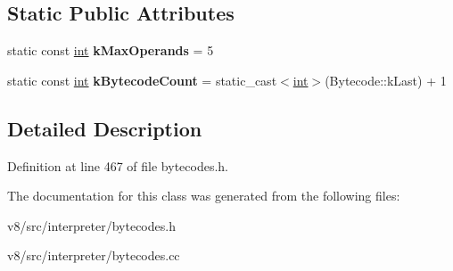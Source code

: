 \subsection*{Static Public Attributes}
\begin{DoxyCompactItemize}
\item 
\mbox{\label{classv8_1_1internal_1_1interpreter_1_1Bytecodes_a59a25d6f1d42143d77de614ce2415491}} 
static const \mbox{\hyperlink{classint}{int}} {\bfseries k\+Max\+Operands} = 5
\item 
\mbox{\label{classv8_1_1internal_1_1interpreter_1_1Bytecodes_a2f936ba0527c716efea335cbeddc2594}} 
static const \mbox{\hyperlink{classint}{int}} {\bfseries k\+Bytecode\+Count} = static\+\_\+cast$<$\mbox{\hyperlink{classint}{int}}$>$(Bytecode\+::k\+Last) + 1
\end{DoxyCompactItemize}


\subsection{Detailed Description}


Definition at line 467 of file bytecodes.\+h.



The documentation for this class was generated from the following files\+:\begin{DoxyCompactItemize}
\item 
v8/src/interpreter/bytecodes.\+h\item 
v8/src/interpreter/bytecodes.\+cc\end{DoxyCompactItemize}
